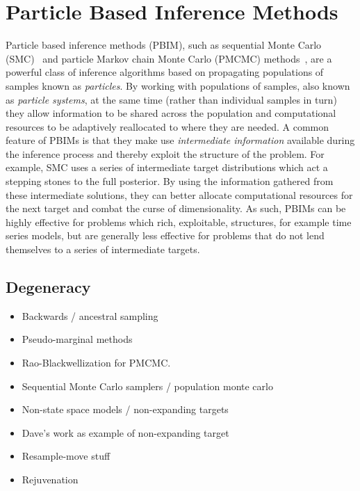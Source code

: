 
\chapter{Particle Based Inference Methods}
\label{sec:part}

Particle based inference methods (PBIM), such as sequential Monte Carlo (SMC)~\citep{gordon1993novel,doucet2001introduction} and 
particle Markov chain Monte Carlo (PMCMC) methods~\citep{andrieu2009pseudo,rainforth2016interacting},
are a powerful class of inference algorithms based on propagating populations of samples
known as \emph{particles}.  By working with populations of samples, also known as \emph{particle systems},
 at the same time (rather than individual
samples in turn) they allow information to be shared across the population and computational
resources to be adaptively reallocated to where they are needed.  A common feature of PBIMs is
that they make use \emph{intermediate information} available during the inference process and thereby
exploit the structure of the problem.  For example, SMC uses a series of intermediate target distributions
which act a stepping stones to the full posterior.  By using the information gathered from these intermediate
solutions, they can better allocate computational resources for the next target and combat the curse of
dimensionality.  As such, PBIMs can be highly effective for problems which rich, exploitable, structures, 
for example time series models, but are generally less effective for problems that do not lend themselves
to a series of intermediate targets.



\section{Degeneracy}



\begin{itemize}
	\item Backwards / ancestral sampling
	\item Pseudo-marginal methods
	\item Rao-Blackwellization for PMCMC.
	\item Sequential Monte Carlo samplers / population monte carlo
	\item Non-state space models / non-expanding targets
	\item Dave's work as example of non-expanding target
	\item Resample-move stuff
	\item Rejuvenation
\end{itemize}